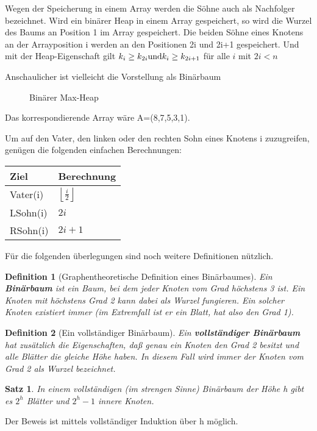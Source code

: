\documentclass[ngerman,draft,parskip=half*,twoside]{scrreprt}
\theoremstyle{break}
\newtheorem{definition}{Definition}
\newtheorem{satz}{Satz}
\begin{document}
Wegen der Speicherung in einem Array werden die Söhne auch als Nachfolger bezeichnet.
Wird ein binärer Heap in einem Array gespeichert, so wird die Wurzel des Baums an Position 1 im Array gespeichert. Die beiden
Söhne eines Knotens an der Arrayposition i werden an den Positionen 2i und 2i+1 gespeichert.
Und mit der Heap-Eigenschaft gilt $k_{i}\geq k_{2i} \textup{und}  k_{i}\geq k_{2i+1}$ für alle $i$ mit $2i<n$  

Anschaulicher ist vielleicht die Vorstellung als Binärbaum
\begin{figure}[H]
	\centering
	\caption{Binärer Max-Heap}
	\label{101103a}
\end{figure}
Das korrespondierende Array wäre A=(8,7,5,3,1).
\bigskip

Um auf den Vater, den linken oder den rechten Sohn eines Knotens i zuzugreifen, genügen die folgenden einfachen Berechnungen:

\begin{tabular}{l|l}
Ziel & Berechnung\\
\hline
Vater(i) & $\left\lfloor\frac{i}{2}\right\rfloor$\\
LSohn(i) & $2i$\\
RSohn(i) & $2i+1$\\
\end{tabular}

Für die folgenden überlegungen sind noch weitere Definitionen nützlich.

\begin{definition}[Graphentheoretische Definition eines Binärbaumes]
Ein \textbf{Binärbaum} ist ein Baum, bei dem jeder Knoten vom Grad höchstens 3 ist. Ein Knoten mit
höchstens Grad 2 kann dabei als Wurzel fungieren. Ein solcher Knoten existiert immer (im Extremfall ist er ein Blatt, hat also den Grad
1). 
\end{definition}

\begin{definition}[Ein vollständiger Binärbaum]
Ein \textbf{vollständiger Binärbaum} hat zusätzlich die Eigenschaften, daß genau ein Knoten den Grad 2 besitzt und alle Blätter die
gleiche Höhe haben. In diesem Fall wird immer der Knoten vom Grad 2 als Wurzel bezeichnet.
\end{definition}

\begin{satz}
In einem vollständigen (im strengen Sinne) Binärbaum der Höhe h gibt es $2^{h}$ Blätter und $2^h-1$ innere Knoten.
\end{satz}
Der Beweis ist mittels vollständiger Induktion über h möglich.
\end{document}
